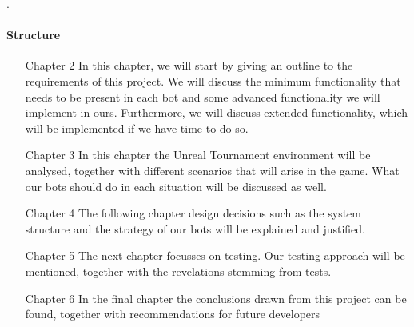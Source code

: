 .

\paragraph{Structure}


\begin{enumerate}
\item[Chapter 2] In this chapter, we will start by giving an outline to the requirements of this project. We will discuss the minimum functionality that needs to be present in each bot and some advanced functionality we will implement in ours. Furthermore, we will discuss extended functionality, which will be implemented if we have time to do so.

\item[Chapter 3] In this chapter the Unreal Tournament environment will be analysed, together with different scenarios that will arise in the game. What our bots should do in each situation will be discussed as well.

\item[Chapter 4] The following chapter design decisions such as the system structure and the strategy of our bots will be explained and justified.

\item[Chapter 5] The next chapter focusses on testing. Our testing approach will be mentioned, together with the revelations stemming from tests.

\item[Chapter 6] In the final chapter the conclusions drawn from this project can be found, together with recommendations for future developers
\end{enumerate}